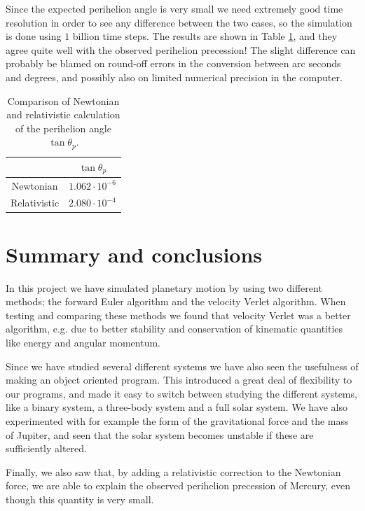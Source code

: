 \documentclass[12pt, a4paper]{article}
\begin{document}
Since the expected perihelion angle is very small we need extremely good time resolution in order to 
see any difference between the two cases, so the simulation is done using $1$ billion time steps. 
The results are shown in Table \ref{tab:perihelion}, and they agree quite well with the observed 
perihelion precession! The slight difference can probably be blamed on round-off errors in the conversion 
between arc seconds and degrees, and possibly also on limited numerical precision in the computer.  

\begin{table}[ht!]
\caption{Comparison of Newtonian and relativistic calculation of the perihelion angle $\tan\theta_p$.}
\label{tab:perihelion}
\begin{center}
\begin{tabular}{cc} \\ \hline\hline 
& $\tan\theta_p$ \\ \hline
Newtonian & $1.062\cdot 10^{-6}$ \\
Relativistic & $2.080\cdot 10^{-4}$ \\ \hline\hline
\end{tabular}
\end{center}
\end{table}


\section{Summary and conclusions}

In this project we have simulated planetary motion by using two different methods; the forward Euler 
algorithm and the velocity Verlet algorithm. When testing and comparing these methods we found that 
velocity Verlet was a better algorithm, e.g. due to better stability and conservation of kinematic 
quantities like energy and angular momentum. 

Since we have studied several different systems we have also seen the usefulness of making an object 
oriented program. This introduced a great deal of flexibility to our programs, and made it easy to switch 
between studying the different systems, like a binary system, a three-body system and a full solar system. 
We have also experimented with for example the form of the gravitational force and the mass of Jupiter, 
and seen that the solar system becomes unstable if these are sufficiently altered. 

Finally, we also saw that, by adding a relativistic correction to the Newtonian force, we are able to 
explain the observed perihelion precession of Mercury, even though this quantity is very small.  
\end{document}
